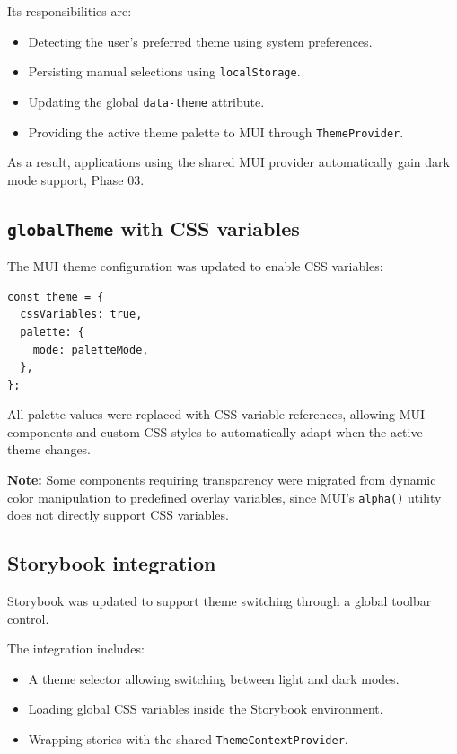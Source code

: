 Its responsibilities are:

\begin{itemize}
    \item Detecting the user's preferred theme using system preferences.
    \item Persisting manual selections using \lstinline|localStorage|.
    \item Updating the global \lstinline|data-theme| attribute.
    \item Providing the active theme palette to MUI through \texttt{ThemeProvider}.
\end{itemize}

As a result, applications using the shared MUI provider automatically gain dark mode support, Phase 03.

\subsection{\texttt{globalTheme} with CSS variables}

The MUI theme configuration was updated to enable CSS variables:

\begin{lstlisting}
const theme = {
  cssVariables: true,
  palette: {
    mode: paletteMode,
  },
};
\end{lstlisting}

All palette values were replaced with CSS variable references, allowing MUI components and custom CSS styles to automatically adapt when the active theme changes.

\textbf{Note:} Some components requiring transparency were migrated from dynamic color manipulation to predefined overlay variables, since MUI's \lstinline|alpha()| utility does not directly support CSS variables.

\subsection{Storybook integration}

Storybook was updated to support theme switching through a global toolbar control.

The integration includes:

\begin{itemize}
    \item A theme selector allowing switching between light and dark modes.
    \item Loading global CSS variables inside the Storybook environment.
    \item Wrapping stories with the shared \texttt{ThemeContextProvider}.
\end{itemize}

